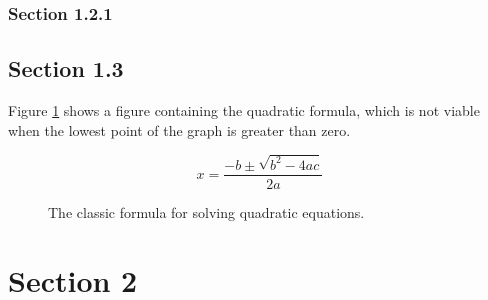 \documentclass[a4paper]{article}
\begin{document}
            \subsubsection{Section 1.2.1}
        \subsection{Section 1.3}
            Figure \ref{figure:example} shows a figure containing the quadratic formula, which is not viable when the lowest point of the graph is greater than zero.
            \begin{center}
                \begin{figure}[h] %
                    \begin{equation}
                        x=\frac{-b\pm\sqrt{b^2-4ac}}{2a}
                    \end{equation}
                    \caption{The classic formula for solving quadratic equations.}
                    \label{figure:example}
                \end{figure}
            \end{center}
    \section{Section 2}
\end{document}
